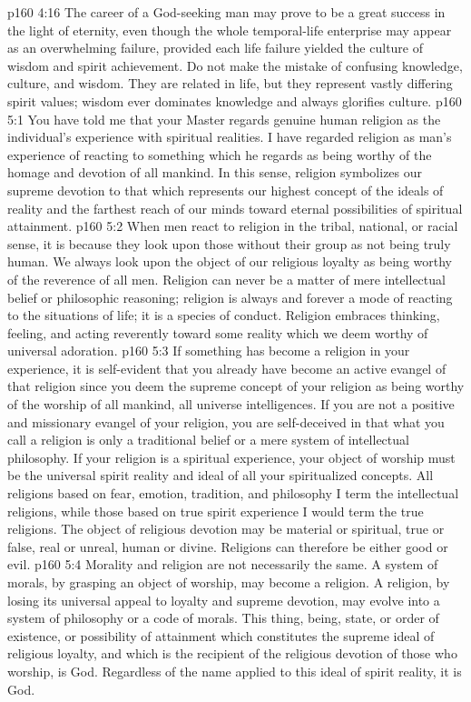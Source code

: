 \vs p160 4:16 The career of a God\hyp{}seeking man may prove to be a great success in the light of eternity, even though the whole temporal\hyp{}life enterprise may appear as an overwhelming failure, provided each life failure yielded the culture of wisdom and spirit achievement. Do not make the mistake of confusing knowledge, culture, and wisdom. They are related in life, but they represent vastly differing spirit values; wisdom ever dominates knowledge and always glorifies culture.
\vs p160 5:1 You have told me that your Master regards genuine human religion as the individual’s experience with spiritual realities. I have regarded religion as man’s experience of reacting to something which he regards as being worthy of the homage and devotion of all mankind. In this sense, religion symbolizes our supreme devotion to that which represents our highest concept of the ideals of reality and the farthest reach of our minds toward eternal possibilities of spiritual attainment.
\vs p160 5:2 When men react to religion in the tribal, national, or racial sense, it is because they look upon those without their group as not being truly human. We always look upon the object of our religious loyalty as being worthy of the reverence of all men. Religion can never be a matter of mere intellectual belief or philosophic reasoning; religion is always and forever a mode of reacting to the situations of life; it is a species of conduct. Religion embraces thinking, feeling, and acting reverently toward some reality which we deem worthy of universal adoration.
\vs p160 5:3 If something has become a religion in your experience, it is self\hyp{}evident that you already have become an active evangel of that religion since you deem the supreme concept of your religion as being worthy of the worship of all mankind, all universe intelligences. If you are not a positive and missionary evangel of your religion, you are self\hyp{}deceived in that what you call a religion is only a traditional belief or a mere system of intellectual philosophy. If your religion is a spiritual experience, your object of worship must be the universal spirit reality and ideal of all your spiritualized concepts. All religions based on fear, emotion, tradition, and philosophy I term the intellectual religions, while those based on true spirit experience I would term the true religions. The object of religious devotion may be material or spiritual, true or false, real or unreal, human or divine. Religions can therefore be either good or evil.
\vs p160 5:4 Morality and religion are not necessarily the same. A system of morals, by grasping an object of worship, may become a religion. A religion, by losing its universal appeal to loyalty and supreme devotion, may evolve into a system of philosophy or a code of morals. This thing, being, state, or order of existence, or possibility of attainment which constitutes the supreme ideal of religious loyalty, and which is the recipient of the religious devotion of those who worship, is God. Regardless of the name applied to this ideal of spirit reality, it is God.
